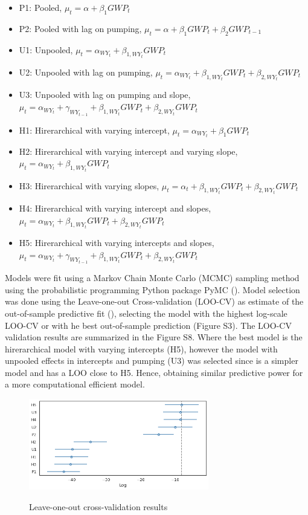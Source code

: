 \documentclass[11pt,a4paper]{article}
\begin{document}
\begin{itemize}[noitemsep,topsep=4pt]
  \item P1: Pooled,   $\mu_t = \alpha + \beta_{1}GWP_{t}$
  \item P2: Pooled with lag on pumping,   $\mu_t = \alpha + \beta_{1}GWP_{t} + \beta_{2}GWP_{t-1} $
  \item U1: Unpooled, $\mu_t = \alpha_{WY_{t}} + \beta_{1,WY_{t}}GWP_{t}$
  \item U2: Unpooled with lag on pumping, $\mu_t = \alpha_{WY_{t}} + \beta_{1,WY_{t}}GWP_{t} + \beta_{2,WY_{t}}GWP_{t} $
  \item U3: Unpooled with lag on pumping and slope, $\mu_t =  \alpha_{WY_{t}} + \gamma_{WY_{t-1}} + \beta_{1,WY_{t}}GWP_{t} + \beta_{2,WY_{t}}GWP_{t}$
  \item H1: Hirerarchical with varying intercept, $\mu_t = \alpha_{WY_{t}} + \beta_{1}GWP_{t}$
  \item H2: Hirerarchical with varying intercept and varying slope, $\mu_t = \alpha_{WY_{t}} + \beta_{1,WY_{t}}GWP_{t}$
  \item H3: Hirerarchical with varying slopes, $\mu_t = \alpha_t + \beta_{1,WY_{t}}GWP_{t} + \beta_{2,WY_{t}}GWP_{t}$
  \item H4: Hirerarchical with varying intercept and slopes, $\mu_t = \alpha_{WY_{t}} + \beta_{1,WY_{t}}GWP_{t} + \beta_{2,WY_{t}}GWP_{t}$
  \item H5: Hirerarchical with varying intercepts and slopes, $\mu_t = \alpha_{WY_{t}} + \gamma_{WY_{t-1}} + \beta_{1,WY_{t}}GWP_{t} + \beta_{2,WY_{t}}GWP_{t}$
\end{itemize}

Models were fit using a Markov Chain Monte Carlo (MCMC) sampling method using the probabilistic programming Python package PyMC (\cite{salvatier_probabilistic_2016}). Model selection was done using the Leave-one-out Cross-validation (LOO-CV) as estimate of the out-of-sample predictive fit (\cite{vehtari_practical_2017}), selecting the model with the highest log-scale LOO-CV or with he best out-of-sample prediction (Figure S3). The LOO-CV validation results are summarized in the Figure S8. Where the best model is the hirerarchical model with varying intercepts (H5), however the model with unpooled effects in intercepts and pumping (U3) was selected since is a simpler model and has a LOO close to H5. Hence, obtaining similar predictive power for a more computational efficient model. 

\begin{figure}[H]
\centering
\includegraphics[width=0.7\textwidth]{model_comparison_calibration.png}
\label{fig:mesh1}
\caption{Leave-one-out cross-validation results}
\end{figure}
\end{document}
